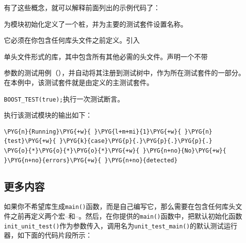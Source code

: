 
有了这些概念，就可以解释前面列出的示例代码了：



为模块初始化定义了一个桩，并为主要的测试套件设置名称。



它必须在你包含任何库头文件之前定义。引入



单头文件形式的库，其中包含所有其他必需的头文件。声明一个不带



参数的测试用例（），并自动将其注册到测试树中，作为所在测试套件的一部分。在本例中，该测试套件就是由定义的主测试套件。



\texttt{BOOST\_\allowbreak{}TEST(\allowbreak{}true)\allowbreak{};}执行一次测试断言。



执行该测试模块的输出如下：



\begin{codeblockbg}
\begin{Verbatim}[commandchars=\\\{\},breaklines=true,breakanywhere=true,fontsize=\codefont,xleftmargin=17bp]
\PYG{n}{Running}\PYG{+w}{ }\PYG{l+m+mi}{1}\PYG{+w}{ }\PYG{n}{test}\PYG{+w}{ }\PYG{k}{case}\PYG{p}{.}\PYG{p}{.}\PYG{p}{.}
\PYG{o}{*}\PYG{o}{*}\PYG{o}{*}\PYG{+w}{ }\PYG{n+no}{No}\PYG{+w}{ }\PYG{n+no}{errors}\PYG{+w}{ }\PYG{n+no}{detected}
\end{Verbatim}
\end{codeblockbg}



\subsection{更多内容}



如果你不希望库生成\texttt{main()}函数，而是自己编写它，那么需要在包含任何库头文件之前再定义两个宏--和--。然后，在你提供的\texttt{main()}函数中，把默认初始化函数\texttt{init\_\allowbreak{}unit\_\allowbreak{}test()}作为参数传入，调用名为\texttt{unit\_\allowbreak{}test\_\allowbreak{}main()}的默认测试运行器，如下面的代码片段所示：


